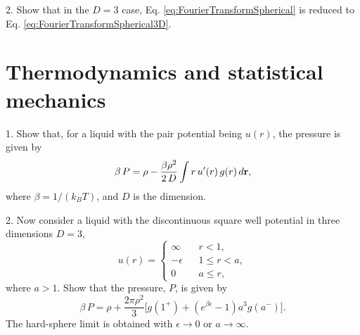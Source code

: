 \documentclass{book}
\begin{document}

2. Show that in the $D = 3$ case,
Eq. \eqref{eq:FourierTransformSpherical}
is reduced to
Eq. \eqref{eq:FourierTransformSpherical3D}.




\chapter{Thermodynamics and statistical mechanics}



1. Show that, for a liquid with the pair potential being $u(r)$,
the pressure is given by
\begin{equation}
  \beta \, P = \rho - \frac{\beta \rho^2} {2\, D} \int r \, u'(r) \, g(r) \, d\boldsymbol{\mathbf{r}},
\end{equation}
where $\beta = 1/(k_BT)$, and $D$ is the dimension.

2. Now consider a liquid with the discontinuous square well potential
in three dimensions $D = 3$,
\begin{equation}
  u(r) =
  \begin{cases}
    \infty      \quad   & r < 1,          \\
    -\epsilon           & 1 \le r < a,    \\
    0                   & a \le r,
  \end{cases}
\end{equation}
where $a > 1$.
%
Show that the pressure, $P$, is given by
\begin{equation}
  \beta \, P = \rho
            + \frac{2 \pi \rho^2}{3}
              \big[g(1^+)
              + (e^{\beta \epsilon} - 1) a^3 g(a^-)\big].
\end{equation}
%
The hard-sphere limit is obtained with $\epsilon \rightarrow 0$
or $a \rightarrow \infty$.
\end{document}
